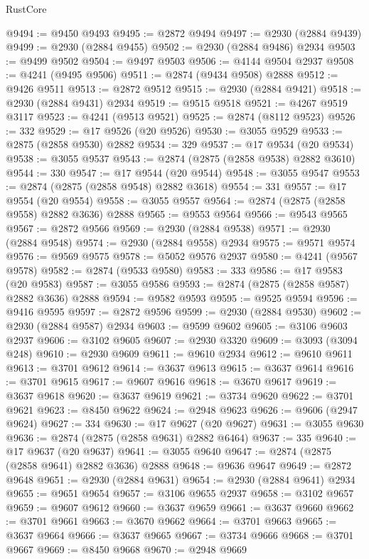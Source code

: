 \begin{lexlean}{RustCore}
\begin{coremodule}
@9494 := @9450 @9493
@9495 := @2872 @9494
@9497 := @2930 (@2884 @9439)
@9499 := @2930 (@2884 @9455)
@9502 := @2930 (@2884 @9486) @2934
@9503 := @9499 @9502
@9504 := @9497 @9503
@9506 := @4144 @9504 @2937
@9508 := @4241 (@9495 @9506)
@9511 := @2874 (@9434 @9508) @2888
@9512 := @9426 @9511
@9513 := @2872 @9512
@9515 := @2930 (@2884 @9421)
@9518 := @2930 (@2884 @9431) @2934
@9519 := @9515 @9518
@9521 := @4267 @9519 @3117
@9523 := @4241 (@9513 @9521)
@9525 := @2874 (@8112 @9523)
@9526 := 332
@9529 := @17 @9526 (@20 @9526)
@9530 := @3055 @9529
@9533 := @2875 (@2858 @9530) @2882
@9534 := 329
@9537 := @17 @9534 (@20 @9534)
@9538 := @3055 @9537
@9543 := @2874 (@2875 (@2858 @9538) @2882 @3610)
@9544 := 330
@9547 := @17 @9544 (@20 @9544)
@9548 := @3055 @9547
@9553 := @2874 (@2875 (@2858 @9548) @2882 @3618)
@9554 := 331
@9557 := @17 @9554 (@20 @9554)
@9558 := @3055 @9557
@9564 := @2874 (@2875 (@2858 @9558) @2882 @3636) @2888
@9565 := @9553 @9564
@9566 := @9543 @9565
@9567 := @2872 @9566
@9569 := @2930 (@2884 @9538)
@9571 := @2930 (@2884 @9548)
@9574 := @2930 (@2884 @9558) @2934
@9575 := @9571 @9574
@9576 := @9569 @9575
@9578 := @5052 @9576 @2937
@9580 := @4241 (@9567 @9578)
@9582 := @2874 (@9533 @9580)
@9583 := 333
@9586 := @17 @9583 (@20 @9583)
@9587 := @3055 @9586
@9593 := @2874 (@2875 (@2858 @9587) @2882 @3636) @2888
@9594 := @9582 @9593
@9595 := @9525 @9594
@9596 := @9416 @9595
@9597 := @2872 @9596
@9599 := @2930 (@2884 @9530)
@9602 := @2930 (@2884 @9587) @2934
@9603 := @9599 @9602
@9605 := @3106 @9603 @2937
@9606 := @3102 @9605
@9607 := @2930 @3320
@9609 := @3093 (@3094 @248)
@9610 := @2930 @9609
@9611 := @9610 @2934
@9612 := @9610 @9611
@9613 := @3701 @9612
@9614 := @3637 @9613
@9615 := @3637 @9614
@9616 := @3701 @9615
@9617 := @9607 @9616
@9618 := @3670 @9617
@9619 := @3637 @9618
@9620 := @3637 @9619
@9621 := @3734 @9620
@9622 := @3701 @9621
@9623 := @8450 @9622
@9624 := @2948 @9623
@9626 := @9606 (@2947 @9624)
@9627 := 334
@9630 := @17 @9627 (@20 @9627)
@9631 := @3055 @9630
@9636 := @2874 (@2875 (@2858 @9631) @2882 @6464)
@9637 := 335
@9640 := @17 @9637 (@20 @9637)
@9641 := @3055 @9640
@9647 := @2874 (@2875 (@2858 @9641) @2882 @3636) @2888
@9648 := @9636 @9647
@9649 := @2872 @9648
@9651 := @2930 (@2884 @9631)
@9654 := @2930 (@2884 @9641) @2934
@9655 := @9651 @9654
@9657 := @3106 @9655 @2937
@9658 := @3102 @9657
@9659 := @9607 @9612
@9660 := @3637 @9659
@9661 := @3637 @9660
@9662 := @3701 @9661
@9663 := @3670 @9662
@9664 := @3701 @9663
@9665 := @3637 @9664
@9666 := @3637 @9665
@9667 := @3734 @9666
@9668 := @3701 @9667
@9669 := @8450 @9668
@9670 := @2948 @9669

\end{coremodule}
\end{lexlean}
